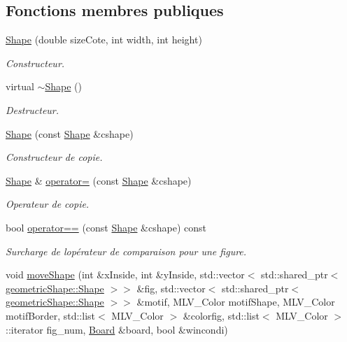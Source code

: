 \subsection*{Fonctions membres publiques}
\begin{DoxyCompactItemize}
\item 
\hyperlink{classgeometric_shape_1_1_shape_aa45bec6f55f33a59991f83a1d0843a53}{Shape} (double size\+Cote, int width, int height)
\begin{DoxyCompactList}\small\item\em Constructeur. \end{DoxyCompactList}\item 
virtual \hyperlink{classgeometric_shape_1_1_shape_a4e4470674c16e4a7058554d473aa5fbf}{$\sim$\+Shape} ()
\begin{DoxyCompactList}\small\item\em Destructeur. \end{DoxyCompactList}\item 
\hyperlink{classgeometric_shape_1_1_shape_ad141f6bc47907a6f19825430fc3638e2}{Shape} (const \hyperlink{classgeometric_shape_1_1_shape}{Shape} \&cshape)
\begin{DoxyCompactList}\small\item\em Constructeur de copie. \end{DoxyCompactList}\item 
\hyperlink{classgeometric_shape_1_1_shape}{Shape} \& \hyperlink{classgeometric_shape_1_1_shape_aef5e79f1181e8284aca3323c56135cd6}{operator=} (const \hyperlink{classgeometric_shape_1_1_shape}{Shape} \&cshape)
\begin{DoxyCompactList}\small\item\em Operateur de copie. \end{DoxyCompactList}\item 
bool \hyperlink{classgeometric_shape_1_1_shape_a20194d8e1bd7a66d64e7874341498a72}{operator==} (const \hyperlink{classgeometric_shape_1_1_shape}{Shape} \&cshape) const
\begin{DoxyCompactList}\small\item\em Surcharge de l\textquotesingle{}opérateur de comparaison pour une figure. \end{DoxyCompactList}\item 
void \hyperlink{classgeometric_shape_1_1_shape_a56c25b597e4a88d0a5d099efd3dfab9d}{move\+Shape} (int \&x\+Inside, int \&y\+Inside, std\+::vector$<$ std\+::shared\+\_\+ptr$<$ \hyperlink{classgeometric_shape_1_1_shape}{geometric\+Shape\+::\+Shape} $>$$>$ \&fig, std\+::vector$<$ std\+::shared\+\_\+ptr$<$ \hyperlink{classgeometric_shape_1_1_shape}{geometric\+Shape\+::\+Shape} $>$$>$ \&motif, M\+L\+V\+\_\+\+Color motif\+Shape, M\+L\+V\+\_\+\+Color motif\+Border, std\+::list$<$ M\+L\+V\+\_\+\+Color $>$ \&colorfig, std\+::list$<$ M\+L\+V\+\_\+\+Color $>$\+::iterator fig\+\_\+num, \hyperlink{class_board}{Board} \&board, bool \&wincondi)

\end{DoxyCompactItemize}
